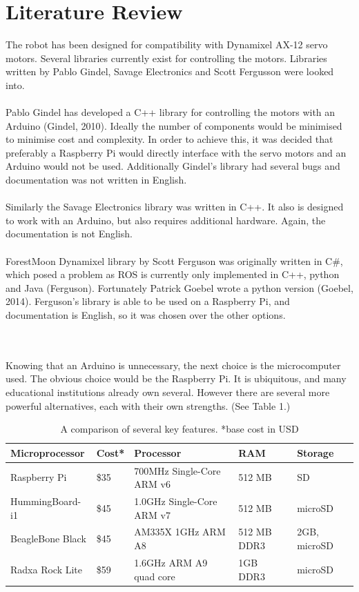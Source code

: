 \documentclass[]{article}
\begin{document}
\section{Literature Review}

The robot has been designed for compatibility with Dynamixel AX-12 servo motors. Several libraries currently exist for controlling the motors. Libraries written by Pablo Gindel, Savage Electronics and Scott Fergusson were looked into.
\\
\\
Pablo Gindel has developed a C++ library for controlling the motors with an Arduino (Gindel, 2010). Ideally the number of components would be minimised to minimise cost and complexity. In order to achieve this, it was decided that preferably a Raspberry Pi would directly interface with the servo motors and an Arduino would not be used. Additionally Gindel's library had several bugs and documentation was not written in English.
\\
\\
Similarly the Savage Electronics library was written in C++. It also is designed to work with an Arduino, but also requires additional hardware. Again, the documentation is not English.
\\
\\
ForestMoon Dynamixel library by Scott Ferguson was originally written in C\#, which posed a problem as ROS is currently only implemented in C++, python and Java (Ferguson). Fortunately Patrick Goebel wrote a python version (Goebel, 2014). Ferguson's library is able to be used on a Raspberry Pi, and documentation is English, so it was chosen over the other options.

\\
\\
Knowing that an Arduino is unnecessary, the next choice is the microcomputer used. The obvious choice would be the Raspberry Pi. It is ubiquitous, and many educational institutions already own several. However there are several more powerful alternatives, each with their own strengths. (See Table 1.)
\\


\begin{table}[h]
\centering
\begin{tabular}[c]{l l p{2.5cm} l p{1.7cm}}
Microprocessor   & Cost* & Processor                             & RAM             & Storage                    \\
\hline
Raspberry Pi     & \$35      & 700MHz Single-Core ARM v6             & 512 MB      & SD                         \\
HummingBoard-i1  & \$45      & 1.0GHz Single-Core ARM v7             & 512 MB      &             microSD               \\
BeagleBone Black & \$45      & AM335X 1GHz ARM A8             & 512 MB DDR3 & 2GB, microSD \\
Radxa Rock Lite  & \$59      & 1.6GHz  ARM A9 quad core & 1GB DDR3           & microSD                   
\end{tabular}
\caption{A comparison of several key features. *base cost in USD}
\end{table}
\end{document}
